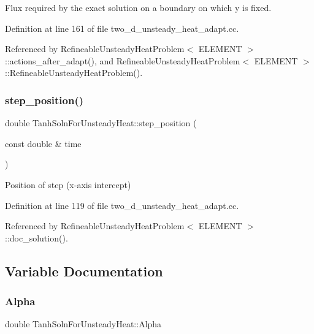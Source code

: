 Flux required by the exact solution on a boundary on which y is fixed. 



Definition at line 161 of file two\+\_\+d\+\_\+unsteady\+\_\+heat\+\_\+adapt.\+cc.



Referenced by Refineable\+Unsteady\+Heat\+Problem$<$ E\+L\+E\+M\+E\+N\+T $>$\+::actions\+\_\+after\+\_\+adapt(), and Refineable\+Unsteady\+Heat\+Problem$<$ E\+L\+E\+M\+E\+N\+T $>$\+::\+Refineable\+Unsteady\+Heat\+Problem().

\mbox{\label{namespaceTanhSolnForUnsteadyHeat_a99f50e575e38e80aa305ead2d4497272}} 
\subsubsection{\texorpdfstring{step\+\_\+position()}{step\_position()}}
{\footnotesize\ttfamily double Tanh\+Soln\+For\+Unsteady\+Heat\+::step\+\_\+position (\begin{DoxyParamCaption}\item[{const double \&}]{time }\end{DoxyParamCaption})}



Position of step (x-\/axis intercept) 



Definition at line 119 of file two\+\_\+d\+\_\+unsteady\+\_\+heat\+\_\+adapt.\+cc.



Referenced by Refineable\+Unsteady\+Heat\+Problem$<$ E\+L\+E\+M\+E\+N\+T $>$\+::doc\+\_\+solution().



\subsection{Variable Documentation}
\mbox{\label{namespaceTanhSolnForUnsteadyHeat_a4c75d9887d6f25405bbead696a94db63}} 
\subsubsection{\texorpdfstring{Alpha}{Alpha}}
{\footnotesize\ttfamily double Tanh\+Soln\+For\+Unsteady\+Heat\+::\+Alpha}



